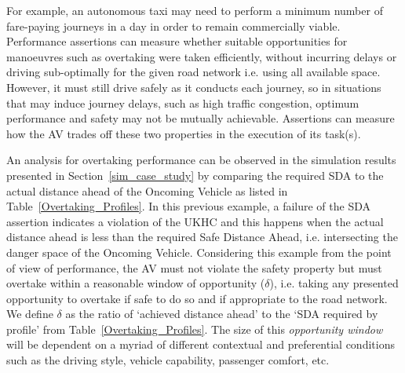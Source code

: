 For example, an autonomous taxi may need to perform a minimum number of fare-paying journeys in a day in order to remain commercially viable. Performance assertions can measure whether suitable opportunities for manoeuvres such as overtaking were taken efficiently, without incurring delays or driving sub-optimally for the given road network i.e. using all available space. However, it must still drive safely as it conducts each journey, so in situations that may induce journey delays, such as high traffic congestion, optimum performance and safety may not be mutually achievable. Assertions can measure how the AV trades off these two properties in the execution of its task(s).

An analysis for overtaking performance can be observed in the simulation results presented in Section~\ref{sim_case_study} by comparing the required SDA to the actual distance ahead of the Oncoming Vehicle as listed in Table~\ref{Overtaking_Profiles}. 
%
In this previous example, a failure of the SDA assertion indicates a violation of the UKHC and this happens when the actual distance ahead is less than the required Safe Distance Ahead, i.e. intersecting the danger space of the Oncoming Vehicle. 
%
Considering this example from the point of view of performance, the AV must not violate the safety property but must overtake within a reasonable window of opportunity ($\delta$), i.e. taking any presented opportunity to overtake if safe to do so and if appropriate to the road network. 
%
We define $\delta$ as the ratio of `achieved distance ahead' to the `SDA required by profile' from Table~\ref{Overtaking_Profiles}. 
%
The size of this \emph{opportunity window} will be dependent on a myriad of different contextual and preferential conditions such as the driving style, vehicle capability, passenger comfort, etc. 

